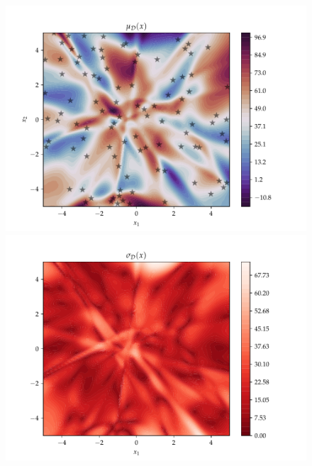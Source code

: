 \begin{figure}[h]
  \centering
  \begin{minipage}[b]{0.49\textwidth}
   \includegraphics[trim=1.2cm 0.7cm 2cm 1cm,clip,width=\textwidth]{Figures/coco_reg/f23_numpyro neural network200-2002.pdf}
  \end{minipage}
  \hfill
  \begin{minipage}[b]{0.49\textwidth}
    \includegraphics[trim=1.2cm 0.7cm 2cm 1cm,clip,width=\textwidth]{Figures/coco_reg/f23_numpyro neural network200-2003.pdf}
   \end{minipage}
  

\end{figure}
